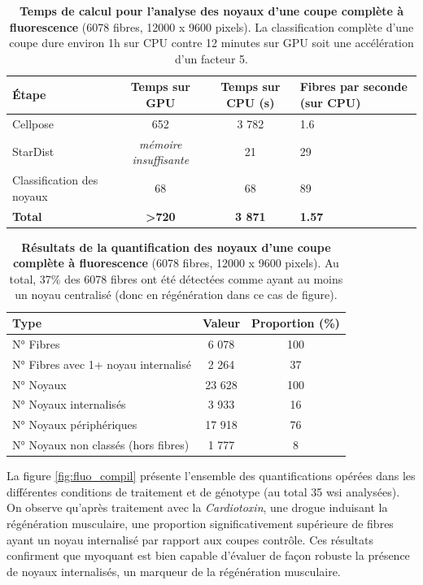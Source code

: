 \begin{table}[htbp]
\centering
\caption[Temps de calcul pour l'analyse des noyaux d'une coupe complète à fluorescence]{\textbf{Temps de calcul pour l'analyse des noyaux d'une coupe complète à fluorescence} (6078 fibres, 12000 x 9600 pixels). La classification complète d'une coupe dure environ 1h sur CPU contre 12 minutes sur GPU soit une accélération d'un facteur 5.}
\label{tab:myoquant_fluo_time}
\begin{tabularx}{\textwidth}{|l|c|c|X|}
\hline
\textbf{Étape} & \textbf{Temps sur GPU} & \textbf{Temps sur CPU (s)} & \textbf{Fibres par seconde (sur CPU)} \\
\hline
Cellpose & 652 & 3 782 & 1.6 \\
\hline
StarDist & \textit{mémoire insuffisante} & 21 & 29 \\
\hline
Classification des noyaux & 68 & 68 & 89 \\
\hline
\textbf{Total} & \textbf{>720} & \textbf{3 871} & \textbf{1.57} \\
\hline
\end{tabularx}
\end{table}

\begin{table}[htbp]
\centering
\caption[Résultats de la quantification des noyaux d'une coupe complète à fluorescence]{\textbf{Résultats de la quantification des noyaux d'une coupe complète à fluorescence} (6078 fibres, 12000 x 9600 pixels). Au total, 37\% des 6078 fibres ont été détectées comme ayant au moins un noyau centralisé (donc en régénération dans ce cas de figure).}
\label{tab:myoquant_fluo_results}
\begin{tabular}{|l|c|c|}
\hline
\textbf{Type} & \textbf{Valeur} & \textbf{Proportion (\%)} \\
\hline
N° Fibres & 6 078 & 100 \\
\hline
N° Fibres avec 1+ noyau internalisé & 2 264 & 37 \\
\hline
\hline
N° Noyaux & 23 628 & 100 \\
\hline
N° Noyaux internalisés & 3 933 & 16 \\
\hline
N° Noyaux périphériques & 17 918 & 76 \\
\hline
N° Noyaux non classés (hors fibres) & 1 777 & 8 \\
\hline
\end{tabular}
\end{table}

La figure \ref{fig:fluo_compil}  présente l'ensemble des quantifications opérées dans les différentes conditions de traitement et de génotype (au total 35 \gls{wsi} analysées). On observe qu'après traitement avec la \textit{Cardiotoxin}, une drogue induisant la régénération musculaire, une proportion significativement supérieure de fibres ayant un noyau internalisé par rapport aux coupes contrôle. Ces résultats confirment que \gls{myoquant} est bien capable d'évaluer de façon robuste la présence de noyaux internalisés, un marqueur de la régénération musculaire.

